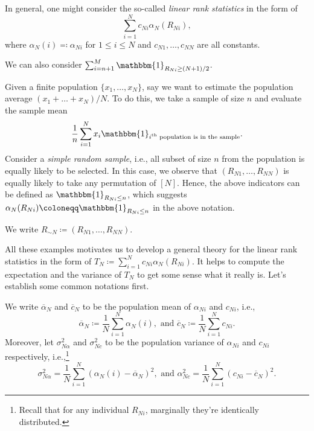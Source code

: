 In general, one might consider the so-called \emph{linear rank statistics} in the form of
\[
	\sum_{i=1}^{N} c_{Ni} \alpha _N(R_{Ni}),
\]
where \(\alpha _N(i) \eqqcolon \alpha _{Ni}\) for \(1 \leq i \leq N\) and \(c_{N1}, \dots , c_{NN}\) are all constants.

\begin{eg}
	We can also consider \(\sum_{i=n+1}^{M} \mathbbm{1}_{R_{Ni} \geq (N+1) / 2}\).
\end{eg}

\begin{eg}
	Given a finite population \(\{ x_1, \dots , x_N \} \), say we want to estimate the population average \((x_1 + \dots + x_N) / N\). To do this, we take a sample of size \(n\) and evaluate the sample mean
	\[
		\frac{1}{n} \sum_{i=1}^{N} x_i \mathbbm{1}_{\text{\(i^{\text{th} }\) population is in the sample} } .
	\]
	Consider a \emph{simple random sample}, i.e., all subset of size \(n\) from the population is equally likely to be selected. In this case, we observe that \((R_{N1}, \dots , R_{NN})\)  is equally likely to take any permutation of \([N]\). Hence, the above indicators can be defined as \(\mathbbm{1}_{R_{Ni} \leq n} \), which suggests \(\alpha _N(R_{Ni}) \coloneqq \mathbbm{1}_{R_{Ni} \leq n} \) in the above notation.
\end{eg}

\begin{notation}
	We write \(R_{\sim N} \coloneqq (R_{N1}, \dots , R_{NN})\).
\end{notation}

All these examples motivates us to develop a general theory for the linear rank statistics in the form of \(T_N \coloneqq \sum_{i=1}^{N} c_{Ni} \alpha _N(R_{Ni})\). It helps to compute the expectation and the variance of \(T_N\) to get some sense what it really is. Let's establish some common notations first.

\begin{notation}
	We write \(\overline{\alpha} _N\) and \(\overline{c} _N\) to be the population mean of \(\alpha _{Ni}\) and \(c_{Ni}\), i.e.,
	\[
		\overline{\alpha} _N \coloneqq \frac{1}{N} \sum_{i=1}^{N} \alpha _N(i), \text{ and }
		\overline{c} _N \coloneqq \frac{1}{N} \sum_{i=1}^{N} c_{Ni}.
	\]
	Moreover, let \(\sigma _{N \alpha }^2\) and \(\sigma _{Nc}^2\) to be the population variance of \(\alpha _{Ni}\) and \(c_{Ni}\) respectively, i.e.,\footnote{Recall that for any individual \(R_{Ni}\), marginally they're identically distributed.}
	\[
		\sigma _{N \alpha }^2 = \frac{1}{N} \sum_{i=1}^{N} (\alpha _N(i) - \overline{\alpha} _N)^2, \text{ and }
		\alpha _{N c}^2 = \frac{1}{N} \sum_{i=1}^{N} (c_{Ni} - \overline{c} _N)^2.
	\]
\end{notation}

